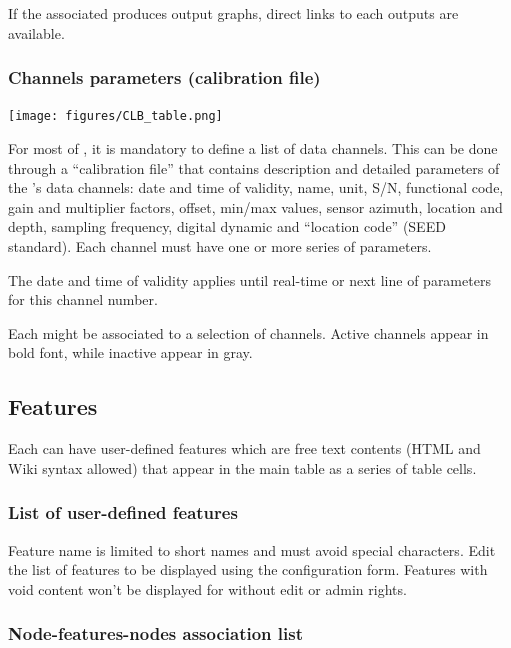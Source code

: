 If the associated  produces output graphs, direct links to each outputs are available.


\subsubsection{Channels parameters (calibration file)}
\label{clb}

\texttt{[image: figures/CLB\_table.png]}

For most of , it is mandatory to define a list of data channels. This can be done through a ``calibration file'' that contains description and detailed parameters of the 's data channels: date and time of validity, name, unit, S/N, functional code, gain and multiplier factors, offset, min/max values, sensor azimuth, location and depth, sampling frequency, digital dynamic and ``location code'' (SEED standard). Each channel must have one or more series of parameters. 

The date and time of validity applies until real-time or next line of parameters for this channel number.

Each  might be associated to a selection of channels. Active channels appear in bold font, while inactive appear in gray.

\subsection{Features}

Each  can have user-defined features which are free text contents (HTML and Wiki syntax allowed) that appear in the main table as a series of table cells.

\subsubsection{List of user-defined features}

Feature name is limited to short names and must avoid special characters. Edit the list of features to be displayed using the  configuration form. Features with void content won't be displayed for  without edit or admin rights.

\subsubsection{Node-features-nodes association list}

